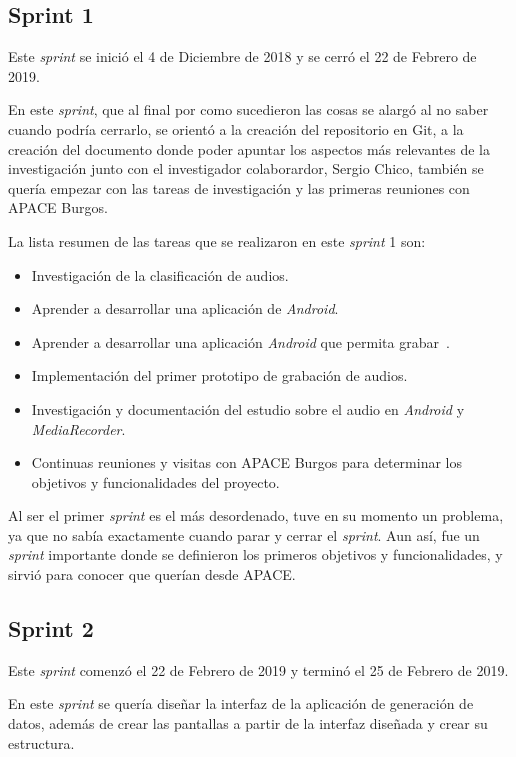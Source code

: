 \subsection{Sprint 1}
Este \textit{sprint} se inició el 4 de Diciembre de 2018 y se cerró el 22 de Febrero de 2019.

En este \textit{sprint}, que al final por como sucedieron las cosas se alargó al no saber cuando podría cerrarlo, se orientó a la creación del repositorio en Git, a la creación del documento donde poder apuntar los aspectos más relevantes de la investigación junto con el investigador colaborardor, Sergio Chico, también se quería empezar con las tareas de investigación y las primeras reuniones con APACE Burgos.

La lista resumen de las tareas que se realizaron en este \textit{sprint} 1 son:
\begin{itemize}
	\item Investigación de la clasificación de audios.
	\item Aprender a desarrollar una aplicación de \textit{Android}.
	\item Aprender a desarrollar una aplicación \textit{Android} que permita grabar~\cite{record}.
	\item Implementación del primer prototipo de grabación de audios.
	\item Investigación y documentación del estudio sobre el audio en \textit{Android} y \textit{MediaRecorder}.
	\item Continuas reuniones y visitas con APACE Burgos para determinar los objetivos y funcionalidades del proyecto.
\end{itemize}

Al ser el primer \textit{sprint} es el más desordenado, tuve en su momento un problema, ya que no sabía exactamente cuando parar y cerrar el \textit{sprint}. Aun así, fue un \textit{sprint} importante donde se definieron los primeros objetivos y funcionalidades, y sirvió para conocer que querían desde APACE.

\subsection{Sprint 2}
Este \textit{sprint} comenzó el 22 de Febrero de 2019 y terminó el 25 de Febrero de 2019.

En este \textit{sprint} se quería diseñar la interfaz de la aplicación de generación de datos, además de crear las pantallas a partir de la interfaz diseñada y crear su estructura.

